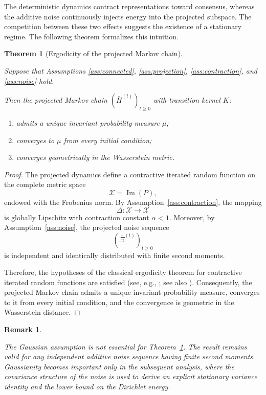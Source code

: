 \documentclass{article}
\newtheorem{theorem}{Theorem}[section]
\newtheorem{remark}{Remark}[section]
\begin{document}
The deterministic dynamics contract representations toward consensus, whereas the additive noise continuously injects energy into the projected subspace. The competition between these two effects suggests the existence of a stationary regime. The following theorem formalizes this intuition.

\begin{theorem}[Ergodicity of the projected Markov chain]
	\label{thm:ergodicity}
	
Suppose that Assumptions
\ref{ass:connected},
\ref{ass:projection},
\ref{ass:contraction},
and
\ref{ass:noise}
hold.
	
Then the projected Markov chain
$(\bar H^{(t)})_{t\ge0}$
with transition kernel $K$:
	\begin{enumerate}
		
		\item admits a unique invariant probability measure
		$\mu$;
		
		\item converges to $\mu$ from every initial condition;
		
		\item converges geometrically in the Wasserstein metric.
		
	\end{enumerate}	
\end{theorem}


\begin{proof}	
	The projected dynamics define a contractive iterated random function on the
	complete metric space
	\[
	\mathcal X=\operatorname{Im}(P),
	\]
	endowed with the Frobenius norm.
	By Assumption~\ref{ass:contraction}, the mapping
	\[
	\Delta:\mathcal X\rightarrow\mathcal X
	\]
	is globally Lipschitz with contraction constant
	\(\alpha<1\).
	Moreover, by Assumption~\ref{ass:noise}, the projected noise sequence
	\[
	(\bar\Xi^{(t)})_{t\ge0}
	\]
	is independent and identically distributed with finite second moments.
	
Therefore, the hypotheses of the classical ergodicity theorem for
contractive iterated random functions are satisfied
(see, e.g.,
\cite[Theorem~1]{diaconis1999iterated};
see also
\cite{hairer2011}).
	Consequently, the projected Markov chain admits a unique invariant
	probability measure, converges to it from every initial condition, and
	the convergence is geometric in the Wasserstein distance.	
\end{proof}



\begin{remark}
	\label{rem:ergodicity}
	
	The Gaussian assumption is not essential for
	Theorem~\ref{thm:ergodicity}.
	The result remains valid for any independent additive noise sequence
	having finite second moments.	
	Gaussianity becomes important only in the subsequent analysis,
	where the covariance structure of the noise is used to derive an explicit
	stationary variance identity and the lower bound on the Dirichlet energy.
	
\end{remark}
\end{document}
